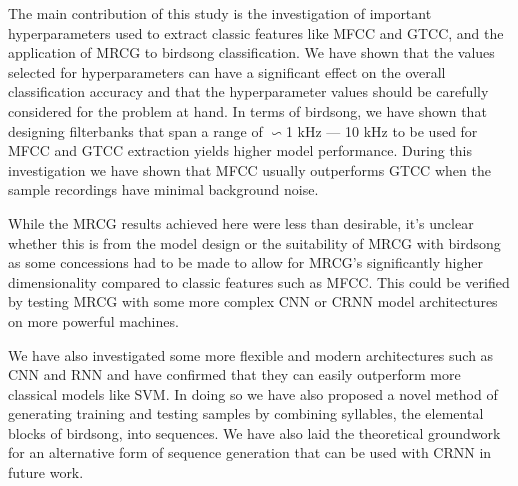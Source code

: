 The main contribution of this study is the investigation of important
hyperparameters used to extract classic features like MFCC and GTCC, and the
application of MRCG to birdsong classification. We have shown that the values
selected for hyperparameters can have a significant effect on the overall
classification accuracy and that the hyperparameter values should be carefully
considered for the problem at hand. In terms of birdsong, we have shown that
designing filterbanks that span a range of $\backsim$1 kHz --- 10 kHz to be
used for MFCC and GTCC extraction yields higher model performance. During this
investigation we have shown that MFCC usually outperforms GTCC when the sample
recordings have minimal background noise.

While the MRCG results achieved here were less than desirable, it's unclear
whether this is from the model design or the suitability of MRCG with birdsong
as some concessions had to be made to allow for MRCG's significantly higher
dimensionality compared to classic features such as MFCC\@. This could be
verified by testing MRCG with some more complex CNN or CRNN model architectures
on more powerful machines.

We have also investigated some more flexible and modern architectures such as CNN
and RNN and have confirmed that they can easily outperform more classical models
like SVM\@. In doing so we have also proposed a novel method of generating
training and testing samples by combining syllables, the elemental blocks of
birdsong, into sequences. We have also laid the theoretical groundwork for an
alternative form of sequence generation that can be used with CRNN in future work.
